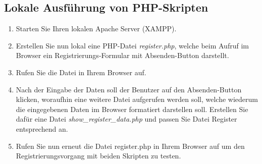 \documentclass[]{article}
\begin{document}
\subsection{Lokale Ausführung von PHP-Skripten}
\begin{enumerate}
\item Starten Sie Ihren lokalen Apache Server (XAMPP).
\item Erstellen Sie nun lokal eine PHP-Datei \textit{register.php}, welche beim Aufruf im Browser ein Registrierungs-Formular mit Absenden-Button darstellt. 
\item Rufen Sie die Datei in Ihrem Browser auf.
\item Nach der Eingabe der Daten soll der Benutzer auf den Absenden-Button klicken, woraufhin eine weitere Datei aufgerufen werden soll, welche wiederum die eingegebenen Daten im Browser formatiert darstellen soll. Erstellen Sie dafür eine Datei \textit{show\_register\_data.php} und passen Sie Datei Register entsprechend an.
\item Rufen Sie nun erneut die Datei register.php in Ihrem Browser auf um den Registrierungsvorgang mit beiden Skripten zu testen.
\end{enumerate}
\end{document}
